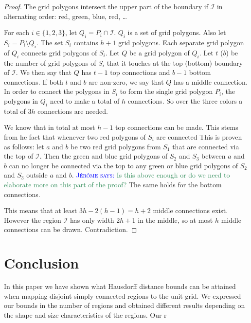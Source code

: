 \documentclass[a4paper,UKenglish,cleveref]{lipics-v2019}
\newcommand{\mremark}[3]{\textcolor{blue}{\textsc{#1 #2:}} \textcolor{SeaGreen}{\textsf{#3}}}
\newcommand{\jerome}[2][says]{\mremark{J\'er\^ome}{#1}{#2}}
\newcommand{\ixi}{\mathcal{I}}
\begin{document}
\begin{proof}
The grid polygons intersect the upper part of the boundary if $\ixi$ in alternating order: red, green, blue, red, \dots

For each $i\in\{1, 2, 3\}$, let $Q_i=P_i\cap \ixi$.
$Q_i$ is a set of grid polygons.
Also let $S_i=P_i\setminus Q_i$.
The set $S_i$ contains $h+1$ grid polygons.
Each separate grid polygon of $Q_i$ connects grid polygons of $S_i$.
Let $Q$ be a grid polygon of $Q_i$. Let $t$ ($b$) be the number of grid polygons of $S_i$ that it touches at the top (bottom) boundary of $\ixi$. We then say that $Q$ has $t-1$ top connections and $b-1$ bottom connections.
If both $t$ and $b$ are non-zero, we say that $Q$ has a middle connection.
In order to connect the polygons in $S_i$ to form the single grid polygon $P_i$, the polygons in $Q_i$ need to make a total of $h$ connections.
So over the three colors a total of $3h$ connections are needed.

We know that in total at most $h-1$ top connections can be made. This stems from he fact that whenever two red polygons of $S_i$ are connected
This is proven as follows:
let $a$ and $b$ be two red grid polygons from $S_1$ that are connected via the top of $\ixi$. Then the green and blue grid polygons of $S_2$ and $S_3$ between $a$ and $b$ can no longer be connected via the top to any green or blue grid polygons of $S_2$ and $S_3$ outside $a$ and $b$.
\jerome{Is this above enough or do we need to elaborate more on this part of the proof?}
The same holds for the bottom connections.

This means that at least $3h- 2(h-1) = h+2$ middle connections exist. However the region $\ixi$ has only width $2h+1$ in the middle, so at most $h$ middle connections can be drawn.
Contradiction.

\end{proof}




\section{Conclusion} %
\label{sec:conclusion}

In this paper we have shown what Hausdorff distance bounds can be attained when mapping disjoint simply-connected regions to the unit grid. We expressed our bounds in the number of regions and obtained different results depending on the shape and size characteristics of the regions. Our r
\end{document}
